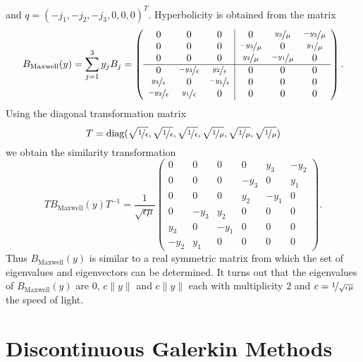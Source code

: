 \documentclass[a4paper,12pt]{article}
\theoremstyle{definition}
\theoremstyle{definition}
\begin{document}
and $q=(-j_1,-j_2,-j_3,0,0,0)^T$. Hyperbolicity is obtained from the 
matrix
\begin{equation}
B_\text{Maxwell}(y) = \sum_{j=1}^{3} y_jB_j = \left( \begin{array}{ccc|ccc}
0 & 0 & 0 & 0 & \nicefrac{y_3}{\mu} & \nicefrac{-y_2}{\mu}\\ 
0 & 0 & 0 & \nicefrac{-y_3}{\mu} & 0 & \nicefrac{y_1}{\mu}\\ 
0 & 0 & 0 & \nicefrac{y_2}{\mu} & \nicefrac{-y_1}{\mu} & 0\\ 
\hline
0 & \nicefrac{-y_3}{\epsilon} & \nicefrac{y_2}{\epsilon} & 0 & 0 & 0\\ 
\nicefrac{y_3}{\epsilon} & 0 & \nicefrac{-y_1}{\epsilon} & 0 & 0 & 0\\ 
\nicefrac{-y_2}{\epsilon} & \nicefrac{y_1}{\epsilon} & 0 & 0 & 0 & 0
\end{array}
\right) .
\end{equation}
Using the diagonal transformation matrix 
$$T=\text{diag}(\sqrt{\nicefrac{1}{\epsilon}},\sqrt{\nicefrac{1}{\epsilon}},\sqrt{\nicefrac{1}{\epsilon}},
\sqrt{\nicefrac{1}{\mu}},\sqrt{\nicefrac{1}{\mu}},\sqrt{\nicefrac{1}{\mu}})$$
we obtain the similarity transformation
\begin{equation}
T B_\text{Maxwell}(y) T^{-1} =
\frac{1}{\sqrt{\epsilon\mu}}\left( \begin{array}{ccc|ccc}
0 & 0 & 0 & 0 & y_3 & -y_2\\ 
0 & 0 & 0 & -y_3 & 0 & y_1\\ 
0 & 0 & 0 & y_2 & -y_1 & 0\\ 
\hline
0 & -y_3 & y_2 & 0 & 0 & 0\\ 
y_3 & 0 & -y_1 & 0 & 0 & 0\\ 
-y_2 & y_1 & 0 & 0 & 0 & 0
\end{array}
\right) .
\end{equation}
Thus $B_\text{Maxwell}(y)$ is similar to a real symmetric matrix from which the
set of eigenvalues and eigenvectors can be determined.
It turns out that the eigenvalues 
of $B_\text{Maxwell}(y)$ are $0$, $c\|y\|$ and $c\|y\|$ each with
multiplicity $2$ and $c=\nicefrac{1}{\sqrt{\epsilon\mu}}$ the speed of light.


\section{Discontinuous Galerkin Methods}
\end{document}
